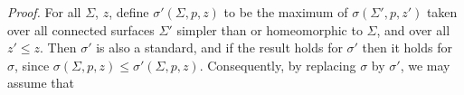 \textit{Proof.} For all $\Sigma$, $z$, define $\sigma'(\Sigma, p, z)$ to be the maximum of $\sigma(\Sigma', p, z')$ taken over all connected surfaces $\Sigma'$ simpler than or homeomorphic to $\Sigma$, and over all $z' \le z$. Then $\sigma'$ is also a standard, and if the result holds for $\sigma'$ then it holds for $\sigma$, since $\sigma(\Sigma, p, z) \le \sigma'(\Sigma, p, z)$. Consequently, by replacing $\sigma$ by $\sigma'$, we may assume that
